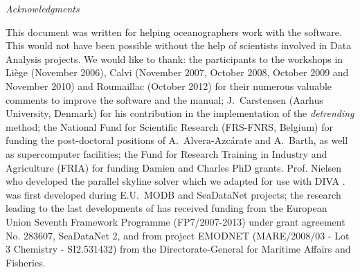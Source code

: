 
\vspace*{\fill}




{\it
\Large{Acknowledgments}
\vspace{1cm}
\parindent 1cm
\begin{center}
\begin{minipage}[c]{.85\textwidth}
\normalsize
This document was written for helping oceanographers work with the \diva software. This would not have been possible without the help of scientists involved in Data Analysis projects.
\newline
\newline
We would like to thank:
\newline
\newline
the participants to the \diva workshops in Li\`{e}ge (November 2006), Calvi (November 2007, October 2008, October 2009 and November 2010) and Roumaillac (October 2012) for their numerous valuable comments to improve the software and the manual;
\newline
\newline
J.~Carstensen (Aarhus University, Denmark) for his contribution in the implementation of the \textit{detrending} method;
\newline
\newline 
the National Fund for Scientific Research (FRS-FNRS, Belgium) for funding the post-doctoral positions of A.~Alvera-Azc\'{a}rate and A.~Barth, as well as supercomputer facilities;
\newline
\newline
the Fund for Research Training in Industry and Agriculture (FRIA) for funding Damien and Charles PhD grants.
\newline
Prof. Nielsen who developed the parallel skyline solver which we adapted for use with DIVA \citep{fcef9d7c510749b0b422021ae57bd58c}.
\newline
\newline
\diva was first developed during E.U.~MODB and SeaDataNet projects; the research leading to the last developments of \diva has received funding from the European Union Seventh Framework Programme (FP7/2007-2013) under grant agreement No. 283607, SeaDataNet 2, and from project EMODNET (MARE/2008/03 - Lot 3 Chemistry - SI2.531432) from the Directorate-General for Maritime Affairs and Fisheries. 
\vspace{2cm}
\end{minipage}

\end{center}
}

\vspace*{\fill}

\newpage
